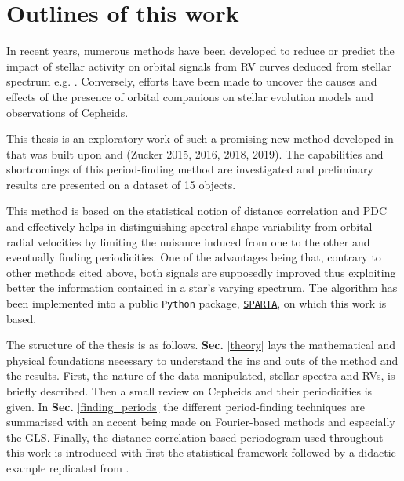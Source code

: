     \section{Outlines of this work}

       In recent years, numerous methods have been developed to reduce or predict the impact of stellar activity on orbital signals from \ac{RV} curves deduced from stellar spectrum e.g. \cite{DeBeurs2022IdentifyingNetworks, Aigrain2012APhotometry, Bellotti2022MitigatingSelection}. Conversely, efforts have been made to uncover the causes and effects of the presence of orbital companions on stellar evolution models and observations of Cepheids.

       \noindent This thesis is an exploratory work of such a promising new method developed in \cite{Binnenfeld2021NewVariation} that was built upon \parencite{Binnenfeld2020USuRPER:Spectra} and (Zucker 2015, 2016, 2018, 2019). The capabilities and shortcomings of this period-finding method are investigated and preliminary results are presented on a dataset of 15 objects.
       
       \noindent This method is based on the statistical notion of distance correlation \parencite{Szekely2007MeasuringDistances} and \ac{PDC} \parencite{Szekely2014PartialDissimilarities} and effectively helps in distinguishing spectral shape variability from orbital radial velocities by limiting the nuisance induced from one to the other and eventually finding periodicities. One of the advantages being that, contrary to other methods cited above, both signals are supposedly improved thus exploiting better the information contained in a star's varying spectrum. The algorithm has been implemented into a public \texttt{Python} package, \href{https://github.com/SPARTA-dev/SPARTA/tree/master}{\texttt{\ac{SPARTA}}}, on which this work is based.

       \noindent The structure of the thesis is as follows. \textbf{Sec.} \ref{theory} lays the mathematical and physical foundations necessary to understand the ins and outs of the method and the results. First, the nature of the data manipulated, stellar spectra and \ac{RV}s, is briefly described. Then a small review on Cepheids and their periodicities is given. In \textbf{Sec.} \ref{finding_periods} the different period-finding techniques are summarised with an accent being made on Fourier-based methods and especially the \ac{GLS}. Finally, the distance correlation-based periodogram used throughout this work is introduced with first the statistical framework followed by a didactic example replicated from \cite{Binnenfeld2021NewVariation}.

